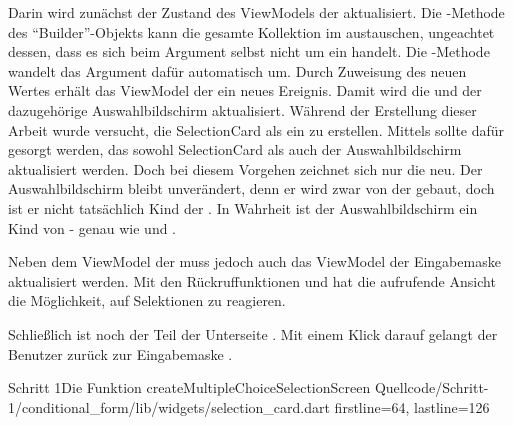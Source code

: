 Darin wird zunächst der Zustand des ViewModels der  aktualisiert.
Die -Methode des \enquote{Builder}-Objekts kann die gesamte Kollektion im  austauschen, ungeachtet dessen, dass es sich beim Argument selbst nicht um ein  handelt.
Die -Methode wandelt das Argument dafür automatisch um.
Durch Zuweisung des neuen Wertes erhält das ViewModel der  ein neues Ereignis.
Damit wird die  und der dazugehörige Auswahlbildschirm aktualisiert.
Während der Erstellung dieser Arbeit wurde versucht, die SelectionCard als ein  zu erstellen.
Mittels  sollte dafür gesorgt werden, das sowohl SelectionCard als auch der Auswahlbildschirm aktualisiert werden.
Doch bei diesem Vorgehen zeichnet sich nur die  neu.
Der Auswahlbildschirm bleibt unverändert, denn er wird zwar von der  gebaut, doch ist er nicht tatsächlich Kind der .
In Wahrheit ist der Auswahlbildschirm ein Kind von  - genau wie  und .

Neben dem ViewModel der  muss jedoch auch das ViewModel der Eingabemaske aktualisiert werden.
Mit den Rückruffunktionen   und   hat die aufrufende Ansicht die Möglichkeit, auf Selektionen zu reagieren.

Schließlich ist noch der  Teil der Unterseite .
Mit einem Klick darauf gelangt der Benutzer zurück zur Eingabemaske .


\begin{alexlisting}{Schritt 1}{Die Funktion createMultipleChoiceSelectionScreen}
  {Quellcode/Schritt-1/conditional_form/lib/widgets/selection_card.dart}
  {firstline=64, lastline=126}
  \label{lst:Schritt1FunktionCreateMultipleChoiceSelectionScreen}
\end{alexlisting}
 
 
\clearpage